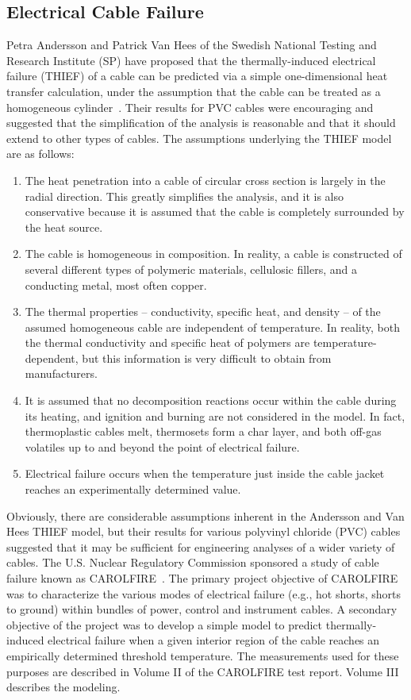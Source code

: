 \documentclass[11pt]{book}
\begin{document}
\subsection{Electrical Cable Failure}
\label{info:THIEF}

Petra Andersson and Patrick Van Hees of the Swedish National Testing and Research Institute
(SP) have proposed that the thermally-induced electrical failure (THIEF) of a cable can be predicted
via a simple one-dimensional heat transfer calculation, under the assumption that the cable can
be treated as a homogeneous cylinder~\cite{Andersson:2005}. Their results for PVC
cables were encouraging and suggested that the simplification of the analysis is reasonable and
that it should extend to other types of cables. The assumptions underlying the THIEF model are as follows:
\begin{enumerate}
\item The heat penetration into a cable of circular cross section is largely in the radial direction.
This greatly simplifies the analysis, and it is also conservative because it is assumed that
the cable is completely surrounded by the heat source.
\item The cable is homogeneous in composition. In reality, a cable is constructed of several
different types of polymeric materials, cellulosic fillers, and a conducting metal, most
often copper.
\item The thermal properties -- conductivity, specific heat, and density -- of the assumed
homogeneous cable are independent of temperature. In reality, both the thermal
conductivity and specific heat of polymers are temperature-dependent, but this
information is very difficult to obtain from manufacturers.
\item It is assumed that no decomposition reactions occur within the cable during its heating,
and ignition and burning are not considered in the model. In fact, thermoplastic cables
melt, thermosets form a char layer, and both off-gas volatiles up to and beyond the point
of electrical failure.
\item Electrical failure occurs when the temperature just inside the cable jacket reaches an
experimentally determined value.
\end{enumerate}
Obviously, there are considerable assumptions inherent in the Andersson and Van Hees THIEF
model, but their results for various polyvinyl chloride (PVC) cables suggested that it may be
sufficient for engineering analyses of a wider variety of cables. The U.S. Nuclear Regulatory
Commission sponsored a study of cable failure known as CAROLFIRE~\cite{CAROLFIRE}. The primary project objective of CAROLFIRE was to
characterize the various modes of electrical
failure (e.g., hot shorts, shorts to ground) within bundles of power, control and instrument cables.
A secondary objective of the project was to develop a simple model to predict thermally-induced
electrical failure when a given interior region of the cable reaches an empirically
determined threshold temperature. The measurements used for these purposes are described in
Volume II of the CAROLFIRE test report. Volume III describes the modeling.
\end{document}
